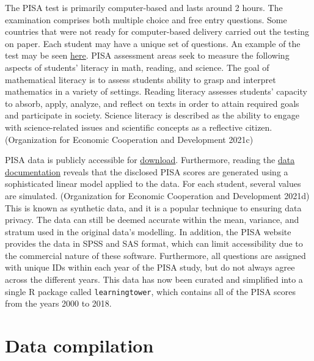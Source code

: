 The PISA test is primarily computer-based and lasts around 2 hours. The examination comprises both multiple choice and free entry questions. Some countries that were not ready for computer-based delivery carried out the testing on paper. Each student may have a unique set of questions. An example of the test may be seen \href{https://www.oecd.org/pisa/test/}{here}. PISA assessment areas seek to measure the following aspects of students' literacy in math, reading, and science. The goal of mathematical literacy is to assess students ability to grasp and interpret mathematics in a variety of settings. Reading literacy assesses students' capacity to absorb, apply, analyze, and reflect on texts in order to attain required goals and participate in society. Science literacy is described as the ability to engage with science-related issues and scientific concepts as a reflective citizen. (Organization for Economic Cooperation and Development 2021c)

PISA data is publicly accessible for \href{https://www.oecd.org/pisa/data/}{download}. Furthermore, reading the \href{https://www.oecd.org/pisa/data/pisa2018technicalreport/Ch.09-Scaling-PISA-Data.pdf}{data documentation} reveals that the disclosed PISA scores are generated using a sophisticated linear model applied to the data. For each student, several values are simulated. (Organization for Economic Cooperation and Development 2021d) This is known as synthetic data, and it is a popular technique to ensuring data privacy. The data can still be deemed accurate within the mean, variance, and stratum used in the original data's modelling. In addition, the PISA website provides the data in SPSS and SAS format, which can limit accessibility due to the commercial nature of these software. Furthermore, all questions are assigned with unique IDs within each year of the PISA study, but do not always agree across the different years. This data has now been curated and simplified into a single R package called \texttt{learningtower}, which contains all of the PISA scores from the years 2000 to 2018.

\hypertarget{data-compilation}{%
\section{Data compilation}\label{data-compilation}}

